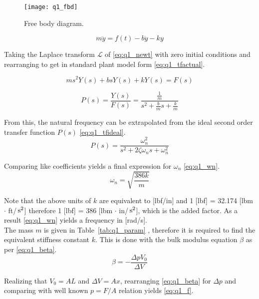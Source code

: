 \begin{figure}[H]
	\centering
	\texttt{[image: q1\_fbd]}
	\caption{Free body diagram.}
	\label{fig:q1_fbd}
\end{figure}

\begin{equation}
	\label{eq:q1_newt}
	m \ddot{y} = f(t) - b\dot{y} - k y
\end{equation}

Taking the Laplace transform $\mathcal{L}$ of \ref{eq:q1_newt} with zero initial conditions and rearranging to get in standard plant model form \ref{eq:q1_tfactual}.

\begin{equation*}
	ms^2 Y(s) + b s Y(s) + k Y(s) = F(s)
\end{equation*}

\begin{equation}
	\label{eq:q1_tfactual}
	P(s) = \frac{Y(s)}{F(s)} = \frac{\frac{1}{m}}{s^2 + \frac{b}{m}s + \frac{k}{m}}
\end{equation}

From this, the natural frequency can be extrapolated from the ideal second order transfer function $P(s)$ \ref{eq:q1_tfideal}.
\begin{equation}
	\label{eq:q1_tfideal}
	P(s)= \frac{\omega_n^2}{s^2+2\zeta\omega_n s + \omega_n^2}
\end{equation}

Comparing like coefficients yields a final expression for $\omega_n$ \ref{eq:q1_wn}.
\begin{equation}
	\label{eq:q1_wn}	
	\omega_n = \sqrt{\frac{386k}{m}}	
\end{equation}

Note that the above units of $k$ are equivalent to [lbf/in] and 1 [lbf] = 32.174 [lbm $\cdot$ ft/$\,\mathrm{s^2}$] therefore 1 [lbf] = 386 [lbm $\cdot$ in/$\,\mathrm{s^2}$], which is the added factor. As a result \ref{eq:q1_wn} yields a frequency in [rad/s].\\

The mass $m$ is given in Table~\ref{tab:q1_param} , therefore it is required to find the equivalent stiffness constant $k$. This is done with the bulk modulus equation $\beta$ as per \ref{eq:q1_beta}.
\begin{equation}
	\label{eq:q1_beta}
	\beta = - \frac{\Delta p V_0}{\Delta V}	
\end{equation}

Realizing that $V_0 = AL$ and $\Delta V = Ax$, rearranging \ref{eq:q1_beta} for $\Delta p$ and comparing with well known $p =F/A$ relation yields \ref{eq:q1_f}.


